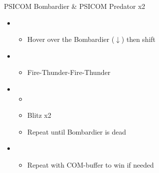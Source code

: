 	\vfill
	\begin{battle}[0:30]{PSICOM Bombardier \& PSICOM Predator x2}
		\begin{itemize}
			\item \first
			      \begin{itemize}
				      \item Hover over the Bombardier ($\downarrow$) then shift
			      \end{itemize}
			\item \second
			      \begin{itemize}
				      \item Fire-Thunder-Fire-Thunder
			      \end{itemize}
			\item \first
			      \begin{itemize}
				      \item \stagger
				      \item Blitz x2
				      \item Repeat until Bombardier is dead
			      \end{itemize}
			\item \second
			      \begin{itemize}
				      \item Repeat with COM-buffer to win if needed
			      \end{itemize}
		\end{itemize}
		 
	\end{battle}

	

